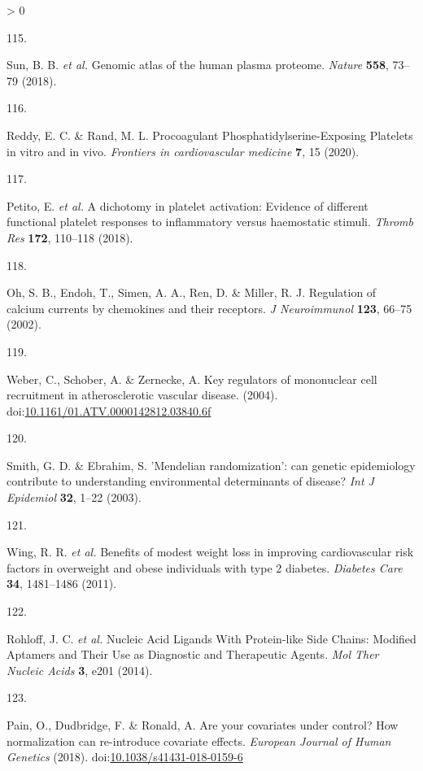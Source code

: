 \documentclass[11pt,twoside]{bristolthesis}
\newlength{\cslhangindent}
\newlength{\csllabelwidth}
\newenvironment{CSLReferences}[2] %
 {%
  \setlength{\parindent}{0pt}
  \ifodd #1 \everypar{\setlength{\hangindent}{\cslhangindent}}\ignorespaces\fi
  \ifnum #2 > 0
  \setlength{\parskip}{#2\baselineskip}
  \fi
 }%
 {}
\newcommand{\CSLLeftMargin}[1]{\parbox[t]{\csllabelwidth}{#1}}
\newcommand{\CSLRightInline}[1]{\parbox[t]{\linewidth - \csllabelwidth}{#1}\break}
\begin{document}
\begin{CSLReferences}{0}{0}
\leavevmode\hypertarget{ref-Sun2018}{}%
\CSLLeftMargin{115. }
\CSLRightInline{Sun, B. B. \emph{et al.} {Genomic atlas of the human plasma proteome}. \emph{Nature} \textbf{558}, 73--79 (2018).}

\leavevmode\hypertarget{ref-Reddy2020}{}%
\CSLLeftMargin{116. }
\CSLRightInline{Reddy, E. C. \& Rand, M. L. {Procoagulant Phosphatidylserine-Exposing Platelets in vitro and in vivo}. \emph{Frontiers in cardiovascular medicine} \textbf{7}, 15 (2020).}

\leavevmode\hypertarget{ref-Petito2018}{}%
\CSLLeftMargin{117. }
\CSLRightInline{Petito, E. \emph{et al.} {A dichotomy in platelet activation: Evidence of different functional platelet responses to inflammatory versus haemostatic stimuli}. \emph{Thromb Res} \textbf{172}, 110--118 (2018).}

\leavevmode\hypertarget{ref-Oh2002}{}%
\CSLLeftMargin{118. }
\CSLRightInline{Oh, S. B., Endoh, T., Simen, A. A., Ren, D. \& Miller, R. J. {Regulation of calcium currents by chemokines and their receptors}. \emph{J Neuroimmunol} \textbf{123}, 66--75 (2002).}

\leavevmode\hypertarget{ref-Weber2004}{}%
\CSLLeftMargin{119. }
\CSLRightInline{Weber, C., Schober, A. \& Zernecke, A. {Key regulators of mononuclear cell recruitment in atherosclerotic vascular disease}. (2004). doi:\href{https://doi.org/10.1161/01.ATV.0000142812.03840.6f}{10.1161/01.ATV.0000142812.03840.6f}}

\leavevmode\hypertarget{ref-Smith2003}{}%
\CSLLeftMargin{120. }
\CSLRightInline{Smith, G. D. \& Ebrahim, S. {'Mendelian randomization': can genetic epidemiology contribute to understanding environmental determinants of disease?} \emph{Int J Epidemiol} \textbf{32}, 1--22 (2003).}

\leavevmode\hypertarget{ref-Wing2011}{}%
\CSLLeftMargin{121. }
\CSLRightInline{Wing, R. R. \emph{et al.} {Benefits of modest weight loss in improving cardiovascular risk factors in overweight and obese individuals with type 2 diabetes}. \emph{Diabetes Care} \textbf{34}, 1481--1486 (2011).}

\leavevmode\hypertarget{ref-Rohloff2014}{}%
\CSLLeftMargin{122. }
\CSLRightInline{Rohloff, J. C. \emph{et al.} {Nucleic Acid Ligands With Protein-like Side Chains: Modified Aptamers and Their Use as Diagnostic and Therapeutic Agents}. \emph{Mol Ther Nucleic Acids} \textbf{3}, e201 (2014).}

\leavevmode\hypertarget{ref-Pain2018}{}%
\CSLLeftMargin{123. }
\CSLRightInline{Pain, O., Dudbridge, F. \& Ronald, A. {Are your covariates under control? How normalization can re-introduce covariate effects}. \emph{European Journal of Human Genetics} (2018). doi:\href{https://doi.org/10.1038/s41431-018-0159-6}{10.1038/s41431-018-0159-6}}


\end{CSLReferences}
\end{document}
